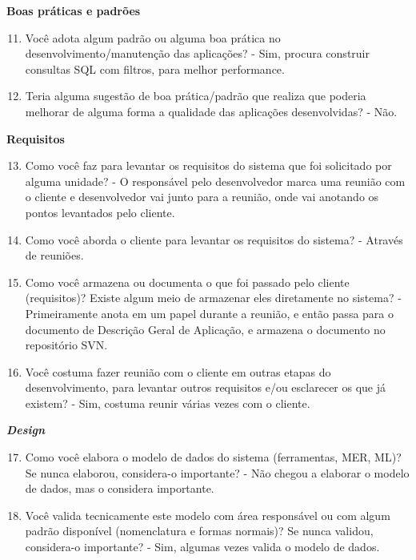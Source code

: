 \begin{apendicesenv}
\textbf{Boas práticas e padrões}

\begin{enumerate}
	\setcounter{enumi}{10}
	\item Você adota algum padrão ou alguma boa prática no desenvolvimento/manutenção das
	aplicações?\newline
	- Sim, procura construir consultas SQL com filtros, para melhor performance.
	\item Teria alguma sugestão de boa prática/padrão que realiza que poderia melhorar de
	alguma forma a qualidade das aplicações desenvolvidas?\newline
	- Não.
\end{enumerate}

\textbf{Requisitos}

\begin{enumerate}
	\setcounter{enumi}{12}
	\item Como você faz para levantar os requisitos do sistema que foi solicitado por alguma
	unidade?\newline
	- O responsável pelo desenvolvedor marca uma reunião com o cliente e desenvolvedor vai junto para a reunião, onde vai anotando os pontos levantados pelo cliente.
	\item Como você aborda o cliente para levantar os requisitos do sistema?\newline
	- Através de reuniões.
	\item Como você armazena ou documenta o que foi passado pelo cliente (requisitos)? Existe
	algum meio de armazenar eles diretamente no sistema?\newline
	- Primeiramente anota em um papel durante a reunião, e então passa para o documento de Descrição Geral de Aplicação, e armazena o documento no repositório SVN.
	\item Você costuma fazer reunião com o cliente em outras etapas do desenvolvimento, para
	levantar outros requisitos e/ou esclarecer os que já existem?\newline
	- Sim, costuma reunir várias vezes com o cliente.
\end{enumerate}

\textbf{\textit{Design}}

\begin{enumerate}
	\setcounter{enumi}{16}
	\item Como você elabora o modelo de dados do sistema (ferramentas, MER, ML)? Se nunca
	elaborou, considera-o importante?\newline
	- Não chegou a elaborar o modelo de dados, mas o considera importante.
	\item Você valida tecnicamente este modelo com área responsável ou com algum padrão
	disponível (nomenclatura e formas normais)? Se nunca validou, considera-o importante?\newline
	- Sim, algumas vezes valida o modelo de dados.
\end{enumerate}


\end{apendicesenv}
